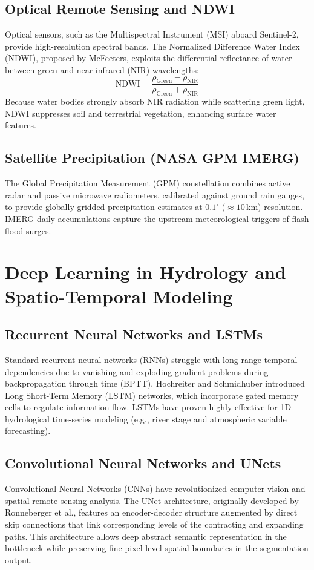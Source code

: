 \documentclass[12pt,a4paper,oneside]{report}
\begin{document}
\subsection{Optical Remote Sensing and NDWI}
Optical sensors, such as the Multispectral Instrument (MSI) aboard Sentinel-2, provide high-resolution spectral bands. The Normalized Difference Water Index (NDWI), proposed by McFeeters, exploits the differential reflectance of water between green and near-infrared (NIR) wavelengths:
\begin{equation}
\text{NDWI} = \frac{\rho_{\text{Green}} - \rho_{\text{NIR}}}{\rho_{\text{Green}} + \rho_{\text{NIR}}}
\end{equation}
Because water bodies strongly absorb NIR radiation while scattering green light, NDWI suppresses soil and terrestrial vegetation, enhancing surface water features.

\subsection{Satellite Precipitation (NASA GPM IMERG)}
The Global Precipitation Measurement (GPM) constellation combines active radar and passive microwave radiometers, calibrated against ground rain gauges, to provide globally gridded precipitation estimates at $0.1^\circ$ ($\approx 10$\,km) resolution. IMERG daily accumulations capture the upstream meteorological triggers of flash flood surges.

\section{Deep Learning in Hydrology and Spatio-Temporal Modeling}
\subsection{Recurrent Neural Networks and LSTMs}
Standard recurrent neural networks (RNNs) struggle with long-range temporal dependencies due to vanishing and exploding gradient problems during backpropagation through time (BPTT). Hochreiter and Schmidhuber introduced Long Short-Term Memory (LSTM) networks, which incorporate gated memory cells to regulate information flow. LSTMs have proven highly effective for 1D hydrological time-series modeling (e.g., river stage and atmospheric variable forecasting).

\subsection{Convolutional Neural Networks and UNets}
Convolutional Neural Networks (CNNs) have revolutionized computer vision and spatial remote sensing analysis. The UNet architecture, originally developed by Ronneberger et al., features an encoder-decoder structure augmented by direct skip connections that link corresponding levels of the contracting and expanding paths. This architecture allows deep abstract semantic representation in the bottleneck while preserving fine pixel-level spatial boundaries in the segmentation output.
\end{document}
